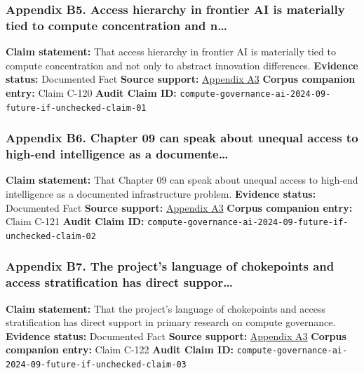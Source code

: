 \documentclass[
  american,
  11pt,
  letterpaper,
]{article}
\begin{document}
\subsubsection{Appendix B5. Access hierarchy in frontier AI is
materially tied to compute concentration and
n\ldots{}}\label{appendix-b5-access-hierarchy-in-frontier-ai-is-materially-tied-to-compute-concentration-and-n}

\textbf{Claim statement:} That access hierarchy in frontier AI is
materially tied to compute concentration and not only to abstract
innovation differences. \textbf{Evidence status:} Documented Fact
\textbf{Source support:}
\hyperref[appendix-a3-computing-power-and-the-governance-of-artificial-intelligence]{Appendix
A3} \textbf{Corpus companion entry:} Claim C-120 \textbf{Audit Claim
ID:} \texttt{compute-governance-ai-2024-09-future-if-unchecked-claim-01}

\subsubsection{Appendix B6. Chapter 09 can speak about unequal access to
high-end intelligence as a
documente\ldots{}}\label{appendix-b6-chapter-09-can-speak-about-unequal-access-to-high-end-intelligence-as-a-documente}

\textbf{Claim statement:} That Chapter 09 can speak about unequal access
to high-end intelligence as a documented infrastructure problem.
\textbf{Evidence status:} Documented Fact \textbf{Source support:}
\hyperref[appendix-a3-computing-power-and-the-governance-of-artificial-intelligence]{Appendix
A3} \textbf{Corpus companion entry:} Claim C-121 \textbf{Audit Claim
ID:} \texttt{compute-governance-ai-2024-09-future-if-unchecked-claim-02}

\subsubsection{Appendix B7. The project's language of chokepoints and
access stratification has direct
suppor\ldots{}}\label{appendix-b7-the-project-s-language-of-chokepoints-and-access-stratification-has-direct-suppor}

\textbf{Claim statement:} That the project's language of chokepoints and
access stratification has direct support in primary research on compute
governance. \textbf{Evidence status:} Documented Fact \textbf{Source
support:}
\hyperref[appendix-a3-computing-power-and-the-governance-of-artificial-intelligence]{Appendix
A3} \textbf{Corpus companion entry:} Claim C-122 \textbf{Audit Claim
ID:} \texttt{compute-governance-ai-2024-09-future-if-unchecked-claim-03}
\end{document}
